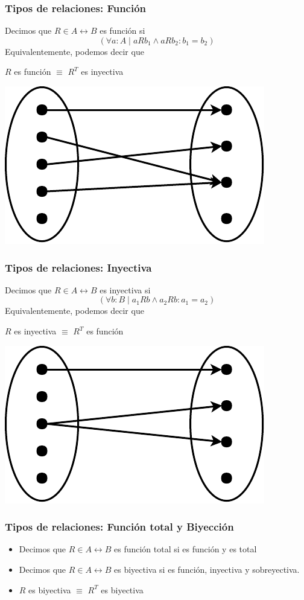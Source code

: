 \documentclass{beamer}
\begin{document}
\begin{frame}[fragile]
    \frametitle{Tipos de relaciones: Función}
    Decimos que $R \in A \leftrightarrow B$ es función si
    $$(\forall a:A \mid aRb_{1} \land aRb_{2}: b_1 = b_2)$$
    Equivalentemente, podemos decir que  
    \begin{center}
        $R$ es función $\equiv$ $R^T$ es inyectiva
    \end{center}
    \begin{center}
        \includegraphics[width=0.5\linewidth]{images/function.pdf}
    \end{center}
\end{frame}

\begin{frame}[fragile]
    \frametitle{Tipos de relaciones: Inyectiva}
    Decimos que $R \in A \leftrightarrow B$ es inyectiva si
    $$(\forall b:B \mid a_{1}Rb \land a_{2}Rb: a_1 = a_2)$$
    Equivalentemente, podemos decir que  
    \begin{center}
        $R$ es inyectiva $\equiv$ $R^T$ es función
    \end{center}
    \begin{center}
        \includegraphics[width=0.5\linewidth]{images/injective.pdf}
    \end{center}
\end{frame}

\begin{frame}[fragile]
    \frametitle{Tipos de relaciones: Función total y Biyección}
    \begin{itemize}
        \item Decimos que $R \in A \leftrightarrow B$ es función total si es función y es total
        \item Decimos que $R \in A \leftrightarrow B$ es biyectiva si es función, inyectiva y sobreyectiva.
        \item $R$ es biyectiva $\equiv$ $R^T$ es biyectiva
    \end{itemize}
\end{frame}
\end{document}
